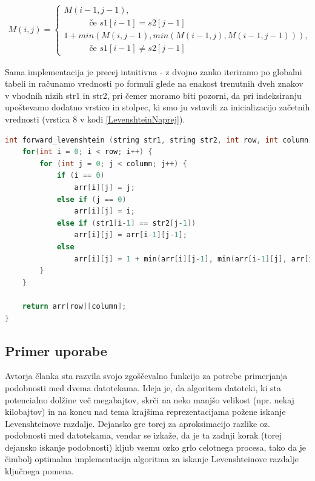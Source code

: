 \documentclass[a4paper,12pt,openright]{book}
\begin{document}
\bigskip \bigskip

\begin{equation}
\label{LevenshteinEquation}
\begin{aligned}
M(i, j) =
\begin{cases}
     M(i-1, j-1) ,     \\ \quad \quad \quad \text{če } s1[i-1]=s2[j-1]\\
     1 + min(M(i, j-1), min(M(i-1, j), M(i-1, j-1))) , \\ \quad \quad \quad \text{če } s1[i-1] \neq s2[j-1]
  \end{cases}
\end{aligned}
\end{equation}

\bigskip \bigskip

Sama implementacija je precej intuitivna - z dvojno zanko iteriramo po globalni tabeli in računamo vrednosti po formuli glede na enakost trenutnih dveh znakov v vhodnih nizih str1 in str2, pri čemer moramo biti pozorni, da pri indeksiranju upoštevamo dodatno vrstico in stolpec, ki smo ju vstavili za inicializacijo začetnih vrednosti (vrstica 8 v kodi \ref{LevenshteinNaprej}). \bigskip \bigskip


\begin{lstlisting}[language=C++, caption={Algoritem za izračun Levenshteinove razdalje}, captionpos=b, label=LevenshteinNaprej]
int forward_levenshtein (string str1, string str2, int row, int column) {
    for(int i = 0; i < row; i++) {
        for (int j = 0; j < column; j++) {    
            if (i == 0)
                arr[i][j] = j;
            else if (j == 0)
                arr[i][j] = i;
            else if (str1[i-1] == str2[j-1])
                arr[i][j] = arr[i-1][j-1];
            else 
                arr[i][j] = 1 + min(arr[i][j-1], min(arr[i-1][j], arr[i-1][j-1]));
        }
    }

    return arr[row][column];
}
\end{lstlisting}


\subsection{Primer uporabe}

Avtorja članka \cite{documentsimilarity} sta razvila svojo zgoščevalno funkcijo za potrebe primerjanja podobnosti med dvema datotekama. Ideja je, da algoritem datoteki, ki sta potencialno dolžine več megabajtov, skrči na neko manjšo velikost (npr. nekaj kilobajtov) in na koncu nad tema krajšima reprezentacijama požene iskanje Levenshteinove razdalje. Dejansko gre torej za aproksimacijo razlike oz. podobnosti med datotekama, vendar se izkaže, da je ta zadnji korak (torej dejansko iskanje podobnosti) kljub vsemu ozko grlo celotnega procesa, tako da je čimbolj optimalna implementacija algoritma za iskanje Levenshteinove razdalje ključnega pomena. 
\end{document}

